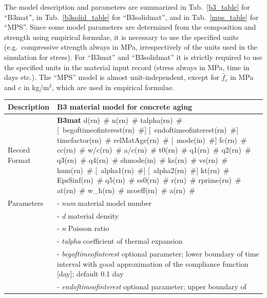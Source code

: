 \documentclass[a4paper]{article}
\newcommand{\descitem}[1]{{\noindent \bf #1}}
\newcommand{\elemparam}[2]{{{#1\tiny (#2)}~\#}}
\newcommand{\optelemparam}[2]{[{~\elemparam{#1}{#2}}]}
\newcommand{\param}[1]{{\it #1}}
\newenvironment{mmt}{\begin{tabular}{|l|p{9cm}|}}{\end{tabular}\\}
\newenvironment{mmt}{\begin{tabular}{|l|l|}}{\end{tabular}\\}
\begin{document}
The model description and parameters are summarized
in Tab.~\ref{b3_table} for ``B3mat'', in Tab.~\ref{b3solid_table} for ``B3solidmat'', and in Tab.~\ref{mps_table} for ``MPS''. 
Since some model parameters are determined from the composition
and strength using empirical formulae, it is necessary to use the
specified units (e.g.\ compressive strength always in MPa, irrespectively
of the units used in the simulation for stress). 
For ``B3mat'' and ``B3solidmat'' it is strictly 
required to use the specified units in the material input record (stress always in MPa, time in days etc.). 
The ``MPS'' model is almost unit-independent, except for 
$\bar{f}_c$ in MPa and $c$ in kg/m$^3$, which are used in empirical formulae.


\begin{table}[!htb]
\begin{mmt}
\hline
Description & B3 material model  for concrete aging\\
\hline
Record Format & \descitem{B3mat}  \elemparam{d}{rn} \elemparam{n}{rn}
\elemparam{talpha}{rn} 
\optelemparam{begoftimeofinterest}{rn} \optelemparam{endoftimeofinterest}{rn} \elemparam{timefactor}{rn} \elemparam{relMatAge}{rn}
%
\optelemparam{mode}{in} 
\elemparam{fc}{rn} \elemparam{cc}{rn} \elemparam{w/c}{rn}
\elemparam{a/c}{rn} \elemparam{t0}{rn}
\elemparam{q1}{rn} \elemparam{q2}{rn} \elemparam{q3}{rn}
\elemparam{q4}{rn}
%
\elemparam{shmode}{in}
\elemparam{ks}{rn} \elemparam{vs}{rn} \elemparam{hum}{rn}
\optelemparam{alpha1}{rn} \optelemparam{alpha2}{rn} 
\elemparam{kt}{rn} \elemparam{EpsSinf}{rn} \elemparam{q5}{rn}
\elemparam{es0}{rn} \elemparam{r}{rn} \elemparam{rprime}{rn}
\elemparam{at}{rn}  
\elemparam{w\_h}{rn} \elemparam{ncoeff}{rn} \elemparam{a}{rn}
\\
Parameters &- \param{num} material model number\\
%
&- \param{d} material density\\
&- \param{n} Poisson ratio\\
&- \param{talpha} coefficient of thermal expansion\\
&- \param{begoftimeofinterest} optional parameter; lower boundary of
time interval with good approximation of the compliance function
[day]; default 0.1 day\\
&- \param{endoftimeofinterest} optional parameter; upper boundary of

\end{mmt}
\end{table}
\end{document}
